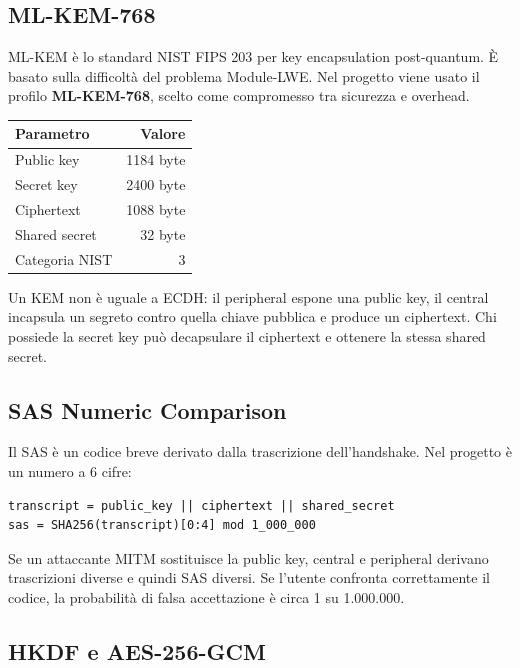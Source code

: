 \documentclass[11pt,a4paper]{article}
\begin{document}
\subsection{ML-KEM-768}\label{ml-kem-768}

ML-KEM è lo standard NIST FIPS 203 per key encapsulation post-quantum. È
basato sulla difficoltà del problema Module-LWE. Nel progetto viene
usato il profilo \textbf{ML-KEM-768}, scelto come compromesso tra
sicurezza e overhead.

\begin{longtable}[]{@{}lr@{}}
\toprule\noalign{}
Parametro & Valore \\
\midrule\noalign{}
\endhead
\bottomrule\noalign{}
\endlastfoot
Public key & 1184 byte \\
Secret key & 2400 byte \\
Ciphertext & 1088 byte \\
Shared secret & 32 byte \\
Categoria NIST & 3 \\
\end{longtable}

Un KEM non è uguale a ECDH: il peripheral espone una public key, il
central incapsula un segreto contro quella chiave pubblica e produce un
ciphertext. Chi possiede la secret key può decapsulare il ciphertext e
ottenere la stessa shared secret.

\subsection{SAS Numeric Comparison}\label{sas-numeric-comparison}

Il SAS è un codice breve derivato dalla trascrizione dell'handshake. Nel
progetto è un numero a 6 cifre:

\begin{lstlisting}
transcript = public_key || ciphertext || shared_secret
sas = SHA256(transcript)[0:4] mod 1_000_000
\end{lstlisting}

Se un attaccante MITM sostituisce la public key, central e peripheral
derivano trascrizioni diverse e quindi SAS diversi. Se l'utente
confronta correttamente il codice, la probabilità di falsa accettazione
è circa 1 su 1.000.000.

\subsection{HKDF e AES-256-GCM}\label{hkdf-e-aes-256-gcm}
\end{document}
